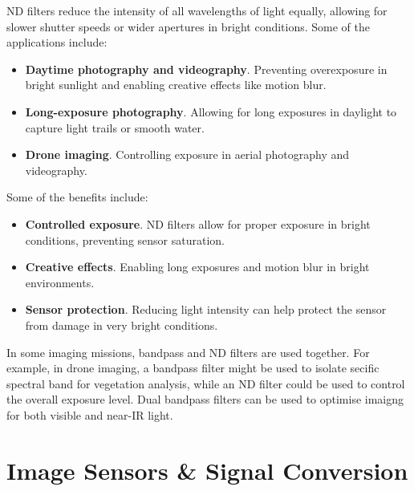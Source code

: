 ND filters reduce the intensity of all wavelengths of light equally, allowing for slower shutter speeds or wider apertures in bright conditions. Some of the applications include:
\begin{itemize}
    \item \textbf{Daytime photography and videography}. Preventing overexposure in bright sunlight and enabling creative effects like motion blur.
    \item \textbf{Long-exposure photography}. Allowing for long exposures in daylight to capture light trails or smooth water.
    \item \textbf{Drone imaging}. Controlling exposure in aerial photography and videography.
\end{itemize}
Some of the benefits include:
\begin{itemize}
    \item \textbf{Controlled exposure}. ND filters allow for proper exposure in bright conditions, preventing sensor saturation.
    \item \textbf{Creative effects}. Enabling long exposures and motion blur in bright environments.
    \item \textbf{Sensor protection}. Reducing light intensity can help protect the sensor from damage in very bright conditions.
\end{itemize}

In some imaging missions, bandpass and ND filters are used together. For example, in drone imaging, a bandpass filter might be used to isolate secific spectral band for vegetation analysis, while an ND filter could be used to control the overall exposure level.
Dual bandpass filters can be used to optimise imaigng for both visible and near-IR light.


\section{Image Sensors \& Signal Conversion}

